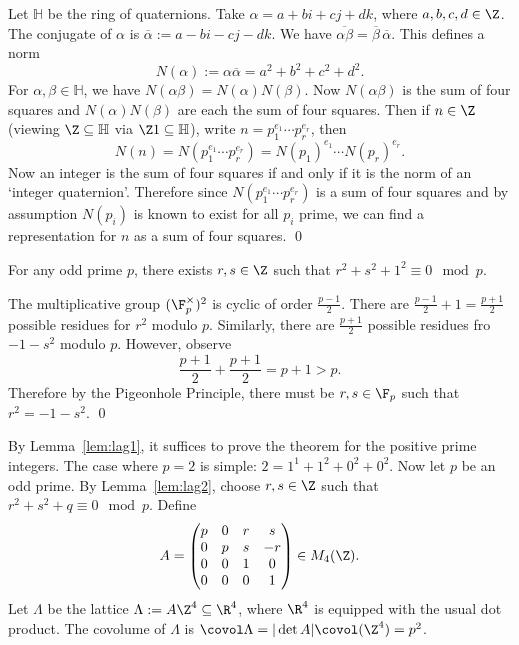 \pf Let $\mathbb{H}$ be the ring of quaternions. Take $\alpha= a +bi+cj+dk$, where $a,b,c,d \in \Z$. The conjugate of $\alpha$ is $\overline{\alpha}:= a-bi-cj-dk$. We have $\overline{\alpha\beta}=\overline{\beta}\,\overline{\alpha}$. This defines a norm
	\[
	N(\alpha):= \alpha \overline{\alpha}= a^2+b^2+c^2+d^2.
	\]
For $\alpha, \beta \in \mathbb{H}$, we have $N(\alpha\beta)=N(\alpha)N(\beta)$. Now $N(\alpha\beta)$ is the sum of four squares and $N(\alpha)N(\beta)$ are each the sum of four squares. Then if $n \in \Z$ (viewing $\Z \subseteq \mathbb{H}$ via $\Z 1 \subseteq \mathbb{H}$), write $n=p_1^{e_1}\cdots p_r^{e_r}$, then
	\[
	N(n)=N(p_1^{e_1}\cdots p_r^{e_r})=N(p_1)^{e_1}\cdots N(p_r)^{e_r}.
	\]
Now an integer is the sum of four squares if and only if it is the norm of an `integer quaternion'. Therefore since $N(p_1^{e_1}\cdots p_r^{e_r})$ is a sum of four squares and by assumption $N(p_i)$ is known to exist for all $p_i$ prime, we can find a representation for $n$ as a sum of four squares.
\qed \\

\begin{lem}\label{lem:lag2}
For any odd prime $p$, there exists $r,s \in \Z$ such that $r^2+s^2+1^2 \equiv 0 \mod p$. 
\end{lem}

\pf The multiplicative group $(\F_p^\times)^2$ is cyclic of order $\frac{p-1}{2}$. There are $\frac{p-1}{2}+1=\frac{p+1}{2}$ possible residues for $r^2$ modulo $p$. Similarly, there are $\frac{p+1}{2}$ possible residues fro $-1-s^2$ modulo $p$. However, observe
	\[
	\frac{p+1}{2} + \frac{p+1}{2}= p+1>p.
	\]
Therefore by the Pigeonhole Principle, there must be $r,s \in \F_p$ such that $r^2= -1 - s^2$. \qed \\


\lagrange*

\pf By Lemma~\ref{lem:lag1}, it suffices to prove the theorem for the positive prime integers. The case where $p=2$ is simple: $2=1^1+1^2+0^2+0^2$. Now let $p$ be an odd prime. By Lemma~\ref{lem:lag2}, choose $r,s \in \Z$ such that $r^2+s^2+q \equiv 0 \mod p$. Define 
	\[
	A= \begin{pmatrix}
	p & 0 & r & s \\
	0 & p & s & -r \\
	0 & 0 & 1 & 0 \\
	0 & 0 & 0 & 1 
	\end{pmatrix} \in M_4(\Z).
	\]
Let $\Lambda$ be the lattice $\Lambda:= A\Z^4 \subseteq \R^4$, where $\R^4$ is equipped with the usual dot product. The covolume of $\Lambda$ is $\covol \Lambda= |\det A| \covol(\Z^4)=p^2$. 

